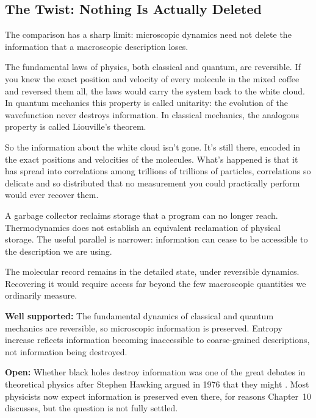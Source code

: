 \subsection{The Twist: Nothing Is Actually Deleted}

The comparison has a sharp limit: microscopic dynamics need not delete the information that a macroscopic description loses.

The fundamental laws of physics, both classical and quantum, are reversible. If you knew the exact position and velocity of every molecule in the mixed coffee and reversed them all, the laws would carry the system back to the white cloud. In quantum mechanics this property is called unitarity: the evolution of the wavefunction never destroys information. In classical mechanics, the analogous property is called Liouville's theorem.

So the information about the white cloud isn't gone. It's still there, encoded in the exact positions and velocities of the molecules. What's happened is that it has spread into correlations among trillions of trillions of particles, correlations so delicate and so distributed that no measurement you could practically perform would ever recover them.

A garbage collector reclaims storage that a program can no longer reach. Thermodynamics does not establish an equivalent reclamation of physical storage. The useful parallel is narrower: information can cease to be accessible to the description we are using.

The molecular record remains in the detailed state, under reversible dynamics. Recovering it would require access far beyond the few macroscopic quantities we ordinarily measure.

\begin{researchnotebox}
\textbf{Well supported:} The fundamental dynamics of classical and quantum mechanics are reversible, so microscopic information is preserved. Entropy increase reflects information becoming inaccessible to coarse-grained descriptions, not information being destroyed.

\textbf{Open:} Whether black holes destroy information was one of the great debates in theoretical physics after Stephen Hawking argued in 1976 that they might \cite{hawking1976}. Most physicists now expect information is preserved even there, for reasons Chapter~10 discusses, but the question is not fully settled.
\end{researchnotebox}


